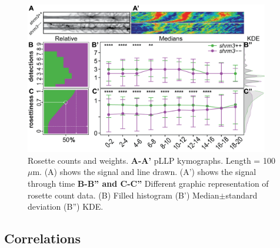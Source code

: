 \documentclass[11pt,singlespacinge,twoside]{reedthesis} %
\begin{document}
\begin{figure}

{\centering \includegraphics[width=0.95\textwidth]{figures/results/03_rosettes/detection} 

}

\caption[Rosette counts and weights]{Rosette counts and weights. \textbf{A-A'} pLLP kymographs. Length = 100 \(\mu\)m. (A) shows the signal and line drawn. (A') shows the signal through time \textbf{B-B'' and C-C''} Different graphic representation of rosette count data. (B) Filled histogram (B') Median\(\pm\)standard deviation (B'') KDE.}\label{fig:rdtdet}
\end{figure}
\hypertarget{correlations}{%
\subsection{Correlations}\label{correlations}}
\end{document}
